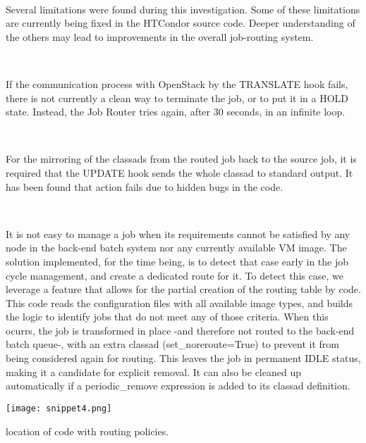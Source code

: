 \documentclass[a4paper]{jpconf}
\begin{document}
~

Several limitations were found during this investigation.
Some of these limitations are currently being fixed in the HTCondor source code.
Deeper understanding of the others may lead to improvements in the overall
job-routing system.

~

If the communication process with OpenStack by the TRANSLATE hook fails, 
there is not currently a clean way to terminate the job, or to put it in a HOLD
state. Instead, the Job Router tries again, after 30 seconds, in an infinite loop.

~

For the mirroring of the classads from the routed job back to the source job, 
it is required that the UPDATE hook sends the whole classad to standard output. 
It has been found that action fails due to hidden bugs in the code. 

~

It is not easy to manage a job when its requirements cannot be satisfied by any
node in the back-end batch system nor any currently available VM image. 
The solution implemented, for the time being, is to detect that case early in
the job cycle management, and create a dedicated route for it. 
To detect this case, we leverage a feature that allows for the partial creation of the routing table by code.
This code reads the configuration files with all available image types, and builds the logic to identify jobs that do not meet any of those criteria. 
When this ocurrs, the job is transformed in place -and therefore not routed to
the back-end batch queue-, with an extra classad (set\_noreroute=True) to prevent it from being considered again for routing.
This leaves the job in permanent IDLE status, making it a candidate for
explicit removal. It can also be cleaned up automatically if a
periodic\_remove expression is added to its classad definition.

\begin{snippet}[h]
    \centering
    \renewcommand\figurename{Snippet}
    \texttt{[image: snippet4.png]}
    \caption{location of code with routing policies.}
    \label{snip:snippet4}
\end{snippet}

\end{document}
